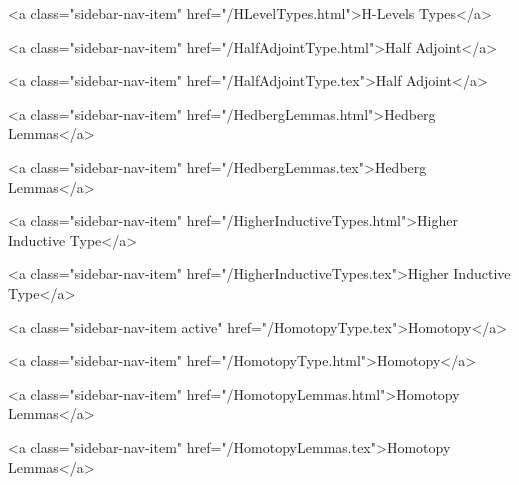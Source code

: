       
        
          <a class="sidebar-nav-item" href="/HLevelTypes.html">H-Levels Types</a>
        
      
    
      
        
          <a class="sidebar-nav-item" href="/HalfAdjointType.html">Half Adjoint</a>
        
      
    
      
        
          <a class="sidebar-nav-item" href="/HalfAdjointType.tex">Half Adjoint</a>
        
      
    
      
        
          <a class="sidebar-nav-item" href="/HedbergLemmas.html">Hedberg Lemmas</a>
        
      
    
      
        
          <a class="sidebar-nav-item" href="/HedbergLemmas.tex">Hedberg Lemmas</a>
        
      
    
      
        
          <a class="sidebar-nav-item" href="/HigherInductiveTypes.html">Higher Inductive Type</a>
        
      
    
      
        
          <a class="sidebar-nav-item" href="/HigherInductiveTypes.tex">Higher Inductive Type</a>
        
      
    
      
        
          <a class="sidebar-nav-item active" href="/HomotopyType.tex">Homotopy</a>
        
      
    
      
        
          <a class="sidebar-nav-item" href="/HomotopyType.html">Homotopy</a>
        
      
    
      
        
          <a class="sidebar-nav-item" href="/HomotopyLemmas.html">Homotopy Lemmas</a>
        
      
    
      
        
          <a class="sidebar-nav-item" href="/HomotopyLemmas.tex">Homotopy Lemmas</a>
        
